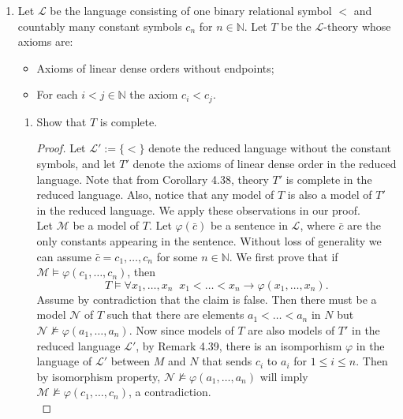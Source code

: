 \documentclass{article}
\begin{document}
\begin{enumerate}[label={\bf Q\arabic*:}]
\begin{enumerate}
      \item Is $T$ complete?
        \begin{proof}
          Yes. $T$ has no finite models and is $\omega$-categorical, hence
          by Vaught's test it is complete.
        \end{proof}
    \end{enumerate}

  \item Let $\mathcal{L}$ be the language consisting of one binary
    relational symbol $<$ and countably many constant symbols $c_n$ for
    $n\in\mathbb{N}$. Let $T$ be the $\mathcal{L}$-theory whose axioms are:
    \begin{itemize}
      \item Axioms of linear dense orders without endpoints;
      \item For each $i<j\in\mathbb{N}$ the axiom $c_i<c_j$.
    \end{itemize}

    \begin{enumerate}
      \item Show that $T$ is complete.
        \begin{proof}
          Let $\mathcal{L}':=\{<\}$ denote the reduced language without the
          constant symbols, and let $T'$ denote the axioms of linear dense
          order in the reduced language. Note that from Corollary 4.38,
          theory $T'$ is complete in the reduced language. Also, notice
          that any model of $T$ is also a model of $T'$ in the reduced
          language. We apply these observations in our proof. \\

          Let $\mathcal{M}$ be a model of $T$. Let $\varphi(\bar{c})$ be a
          sentence in $\mathcal{L}$, where $\bar{c}$ are the only
          constants appearing in the sentence. Without loss of generality
          we can assume $\bar{c}=c_1,\ldots,c_n$ for some $n\in\mathbb{N}$.
          We first prove that if
          $\mathcal{M}\models\varphi(c_1,\ldots,c_n)$, then
          \begin{equation*}
            T\models\forall x_1,\ldots,x_n\;\; x_1<\ldots<
            x_n\rightarrow\varphi(x_1,\ldots,x_n).
          \end{equation*}
          Assume by contradiction that the claim is false. Then there must
          be a model $\mathcal{N}$ of $T$ such that there are elements
          $a_1<\ldots<a_n$ in $N$ but
          $\mathcal{N}\not\models\varphi(a_1,\ldots,a_n)$. Now since models
          of $T$ are also models of $T'$ in the reduced language
          $\mathcal{L}'$, by Remark 4.39, there is an isomporhism $\varphi$
          in the language of $\mathcal{L}'$ between $M$ and $N$ that sends
          $c_i$ to $a_i$ for $1\leq i\leq n$. Then by isomorphism property,
          $\mathcal{N}\not\models\varphi(a_1,\ldots,a_n)$ will imply
          $\mathcal{M}\not\models\varphi(c_1,\ldots,c_n)$, a contradiction.
          \\


\end{proof}
\end{enumerate}
\end{enumerate}
\end{document}
